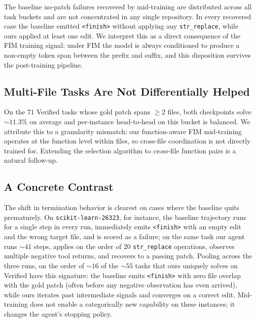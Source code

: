 The baseline no-patch failures recovered by mid-training are
distributed across all task buckets and are not concentrated in any
single repository. In every recovered case the baseline emitted
\texttt{<finish>} without applying any \texttt{str\_replace}, while
ours applied at least one edit. We interpret this as a direct
consequence of the FIM training signal: under FIM the model is always
conditioned to produce a non-empty token span between the prefix and
suffix, and this disposition survives the post-training pipeline.

\subsection{Multi-File Tasks Are Not Differentially Helped}
\label{app:behavior_extra:multifile}

On the $71$ Verified tasks whose gold patch spans $\geq 2$ files, both
checkpoints solve $\sim\!11.3\%$ on average and per-instance
head-to-head on this bucket is balanced. We attribute this to a
granularity mismatch: our function-aware FIM mid-training operates at
the function level within files, so cross-file coordination is not
directly trained for. Extending the selection algorithm to cross-file
function pairs is a natural follow-up.

\subsection{A Concrete Contrast}
\label{app:behavior_extra:contrast}

The shift in termination behavior is clearest on cases where the
baseline quits prematurely. On \texttt{scikit-learn-26323}, for
instance, the baseline trajectory runs for a single step in every run,
immediately emits \texttt{<finish>} with an empty edit and the wrong
target file, and is scored as a failure; on the same task our agent
runs $\sim\!41$ steps, applies on the order of $20$
\texttt{str\_replace} operations, observes multiple negative tool
returns, and recovers to a passing patch. Pooling across the three
runs, on the order of $\sim\!16$ of the $\sim\!55$ tasks that ours
uniquely solves on Verified have this signature: the baseline emits
\texttt{<finish>} with zero file overlap with the gold patch (often
before any negative observation has even arrived), while ours iterates
past intermediate signals and converges on a correct edit.
Mid-training does not enable a categorically new capability on these
instances; it changes the agent's stopping policy.


